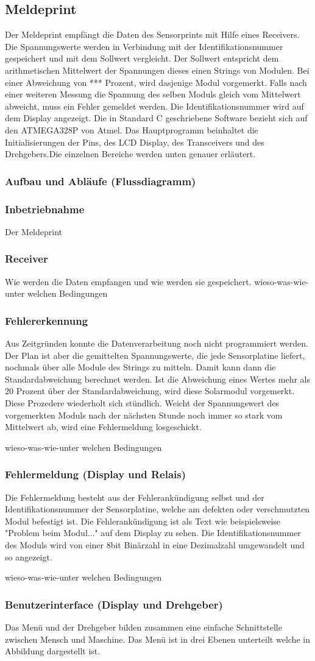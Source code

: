 \subsection{Meldeprint}
Der Meldeprint empfängt die Daten des Sensorprints mit Hilfe eines Receivers. Die Spannungswerte werden in Verbindung mit der Identifikationsnummer gespeichert und mit dem Sollwert vergleicht. Der Sollwert entspricht dem arithmetischen Mittelwert der Spannungen dieses einen Strings von Modulen. Bei einer Abweichung von *** Prozent, wird dasjenige Modul vorgemerkt. Falls nach einer weiteren Messung die Spannung des selben Moduls gleich vom Mittelwert abweicht, muss ein Fehler gemeldet werden. Die Identifikationsnummer wird auf dem Display angezeigt. Die in Standard C geschriebene Software bezieht sich auf den ATMEGA328P von Atmel. Das Hauptprogramm beinhaltet die Initialisierungen der Pins, des LCD Display, des Transceivers und des Drehgebers.Die einzelnen Bereiche werden unten genauer erläutert.
\subsubsection{Aufbau und Abläufe (Flussdiagramm)}
\subsubsection{Inbetriebnahme}
Der Meldeprint
\subsubsection{Receiver}
Wie werden die Daten empfangen und wie werden sie gespeichert.
wieso-was-wie-unter welchen Bedingungen
\subsubsection{Fehlererkennung}
Aus Zeitgründen konnte die Datenverarbeitung noch nicht programmiert werden. Der Plan ist aber die gemittelten Spannungswerte, die jede Sensorplatine liefert, nochmals über alle Module des Strings zu mitteln. Damit kann dann die Standardabweichung berechnet werden. Ist die Abweichung eines Wertes mehr als 20 Prozent über der Standardabweichung, wird diese Solarmodul vorgemerkt. Diese Prozedere wiederholt sich stündlich. Weicht der Spannungswert des vorgemerkten Moduls nach der nächsten Stunde noch immer so stark vom Mittelwert ab, wird eine Fehlermeldung losgeschickt.

wieso-was-wie-unter welchen Bedingungen
\subsubsection{Fehlermeldung (Display und Relais)}
Die Fehlermeldung besteht aus der Fehlerankündigung selbst und der Identifikationsnummer der Sensorplatine, welche am defekten oder verschmutzten Modul befestigt ist. Die Fehlerankündigung ist als Text wie beispielsweise "Problem beim Modul..." auf dem Display zu sehen. Die Identifikationsnummer des Moduls wird von einer 8bit Binärzahl in eine Dezimalzahl umgewandelt und so angezeigt.

wieso-was-wie-unter welchen Bedingungen
\subsubsection{Benutzerinterface (Display und Drehgeber)}
Das Menü und der Drehgeber bilden zusammen eine einfache Schnittstelle zwischen Mensch und Maschine. Das Menü ist in drei Ebenen unterteilt welche in Abbildung  dargestellt ist.
